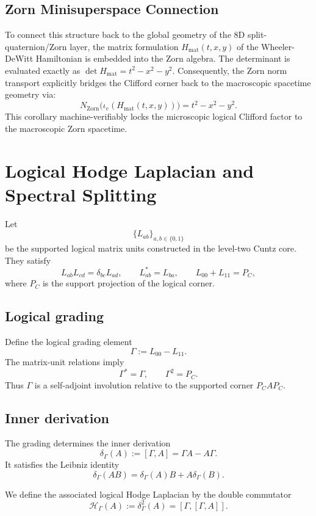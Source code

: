 \documentclass[11pt,a4paper]{article}
\begin{document}
\subsection{Zorn Minisuperspace Connection}
To connect this structure back to the global geometry of the 8D split-quaternion/Zorn layer, the matrix formulation $H_{\mathrm{mat}}(t,x,y)$ of the Wheeler-DeWitt Hamiltonian is embedded into the Zorn algebra. The determinant is evaluated exactly as $\det H_{\mathrm{mat}} = t^2 - x^2 - y^2$. Consequently, the Zorn norm transport explicitly bridges the Clifford corner back to the macroscopic spacetime geometry via:
\begin{equation}
N_{\mathrm{Zorn}} \bigl(\iota_e(H_{\mathrm{mat}}(t,x,y))\bigr) = t^2 - x^2 - y^2.
\end{equation}
This corollary machine-verifiably locks the microscopic logical Clifford factor to the macroscopic Zorn spacetime.

\section{Logical Hodge Laplacian and Spectral Splitting}

Let
\[
\{L_{ab}\}_{a,b\in\{0,1\}}
\]
be the supported logical matrix units constructed in the level-two Cuntz core. They satisfy
\[
L_{ab}L_{cd}=\delta_{bc}L_{ad},
\qquad
L_{ab}^{*}=L_{ba},
\qquad
L_{00}+L_{11}=P_C,
\]
where $P_C$ is the support projection of the logical corner.

\subsection{Logical grading}

Define the logical grading element
\[
\Gamma:=L_{00}-L_{11}.
\]
The matrix-unit relations imply
\[
\Gamma^{*}=\Gamma,
\qquad
\Gamma^{2}=P_C.
\]
Thus $\Gamma$ is a self-adjoint involution relative to the supported corner $P_C A P_C$.

\subsection{Inner derivation}

The grading determines the inner derivation
\[
\delta_{\Gamma}(A)
:=
[\Gamma,A]
=
\Gamma A-A\Gamma.
\]
It satisfies the Leibniz identity
\[
\delta_{\Gamma}(AB)
=
\delta_{\Gamma}(A)B
+
A\delta_{\Gamma}(B).
\]

We define the associated logical Hodge Laplacian by the double commutator
\[
\mathcal H_{\Gamma}(A)
:=
\delta_{\Gamma}^{2}(A)
=
[\Gamma,[\Gamma,A]].
\]
\end{document}
